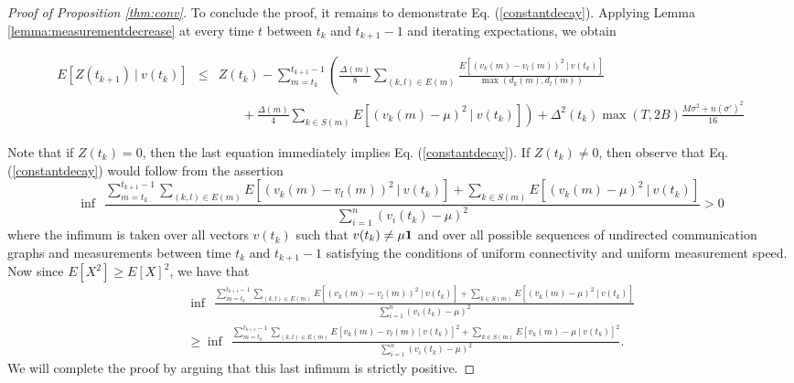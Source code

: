 \documentclass[final]{siamltex}
\begin{document}
\begin{proof}[Proof of {{{Proposition}}} \ref{thm:conv}]
{{{To conclude the proof, it remains to demonstrate}}} Eq. (\ref{constantdecay}). {{{Applying Lemma \ref{lemma:measurementdecrease} at every time $t$ between $t_{k}$ and $t_{k+1}-1$ and iterating expectations, we obtain}}} \begin{small}
\begin{eqnarray} E[Z({{{t_{k+1}}}}) ~|~ v(t_k)] & \leq &  Z({{{t_k}}}) -   \sum_{m=t_k}^{t_{k+1}-1} \left(  \frac{\Delta(m)}{8} \sum_{(k,l) \in E(m)} \frac{E[(v_k(m)- v_l(m))^2 ~|~ v(t_k)]}{\max (d_k(m), d_l(m))} \nonumber \right. \\ && \left. ~~~~~~~~+ \frac{\Delta(m)}{4  }  \sum_{k \in S(m)} E [(v_k(m)  - \mu)^2 ~|~ v(t_k)]  \right)
 + \Delta^2(t_k) \max(T,2B) \frac{{{{ M \sigma^2 + n (\sigma')^2}}}}{16}   \label{decreaseineq}
 \end{eqnarray} \end{small} Note that if $Z(t_k)=0$, then the last equation immediately implies Eq. (\ref{constantdecay}). If $Z(t_k) \neq 0$, then observe that Eq. (\ref{constantdecay}) would follow  from the assertion
\[ \inf ~~ \frac{\sum_{m=t_k}^{t_{k+1}-1} \sum_{(k,l) \in E(m)} E[(v_k(m) - v_l(m))^2 ~|~ v(t_k)] + \sum_{k \in S(m)} E[(v_k(m) - \mu)^2 ~|~ v(t_k)] }{\sum_{i=1}^n (v_i(t_k) - \mu)^2} > 0 \] where the infimum is taken over all vectors $v(t_k)$ such that $v(t_k) \neq \mu {{\bf 1}}$ and over all possible sequences 
of undirected communication graphs and measurements between time $t_k$ and $t_{k+1}-1$ satisfying the conditions of uniform connectivity and uniform measurement speed. Now since $E[X^2] \geq E[X]^2$, we have that \begin{eqnarray*} && \inf ~~ \frac{\sum_{m=t_k}^{t_{k+1}-1} \sum_{(k,l) \in E(m)} E[(v_k(m) - v_l(m))^2 ~|~ v(t_k)] + \sum_{k \in S(m)} E[(v_k(m) - \mu)^2 ~|~ v(t_k)] }{\sum_{i=1}^n (v_i(t_k) - \mu)^2} \\ && \geq  \inf ~~ \frac{\sum_{m=t_k}^{t_{k+1}-1} \sum_{(k,l) \in E(m)} E[v_k(m) - v_l(m) ~|~ v(t_k)]^2 + \sum_{k \in S(m)} E[v_k(m) - \mu ~|~ v(t_k)]^2 }{\sum_{i=1}^n (v_i(t_k) - \mu)^2}.  \end{eqnarray*} We will {{{complete the proof by arguing}}} that this last infimum is strictly positive.


\end{proof}
\end{document}
